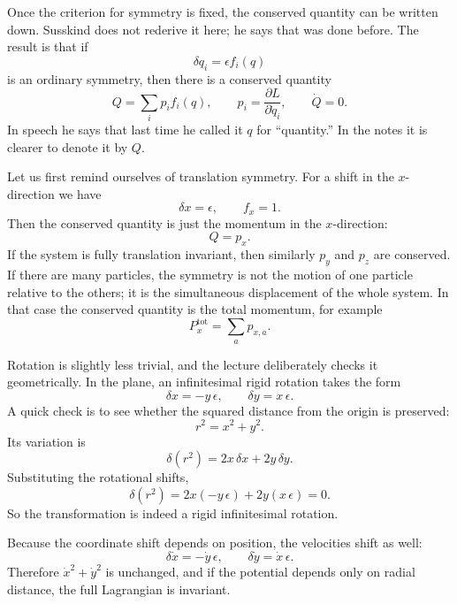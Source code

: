 Once the criterion for symmetry is fixed, the conserved quantity can be written down. Susskind does not rederive it here; he says that was done before. The result is that if
\[
\delta q_i=\epsilon f_i(q)
\]
is an ordinary symmetry, then there is a conserved quantity
\begin{equation}
Q=\sum_i p_i f_i(q),
\qquad
p_i=\frac{\partial L}{\partial \dot q_i},
\qquad
\dot Q=0.
\end{equation}
In speech he says that last time he called it \(q\) for ``quantity.'' In the notes it is clearer to denote it by \(Q\).

Let us first remind ourselves of translation symmetry. For a shift in the \(x\)-direction we have
\begin{equation}
\delta x=\epsilon,
\qquad
f_x=1.
\end{equation}
Then the conserved quantity is just the momentum in the \(x\)-direction:
\[
Q=p_x.
\]
If the system is fully translation invariant, then similarly \(p_y\) and \(p_z\) are conserved. If there are many particles, the symmetry is not the motion of one particle relative to the others; it is the simultaneous displacement of the whole system. In that case the conserved quantity is the total momentum, for example
\begin{equation}
P_x^{\mathrm{tot}}=\sum_a p_{x,a}.
\end{equation}

Rotation is slightly less trivial, and the lecture deliberately checks it geometrically. In the plane, an infinitesimal rigid rotation takes the form
\begin{equation}
\delta x=-y\,\epsilon,
\qquad
\delta y=x\,\epsilon.
\end{equation}
A quick check is to see whether the squared distance from the origin is preserved:
\begin{equation}
r^2=x^2+y^2.
\end{equation}
Its variation is
\begin{equation}
\delta(r^2)=2x\,\delta x+2y\,\delta y.
\end{equation}
Substituting the rotational shifts,
\begin{equation}
\delta(r^2)=2x(-y\,\epsilon)+2y(x\,\epsilon)=0.
\end{equation}
So the transformation is indeed a rigid infinitesimal rotation.

Because the coordinate shift depends on position, the velocities shift as well:
\begin{equation}
\delta \dot x=-\dot y\,\epsilon,
\qquad
\delta \dot y=\dot x\,\epsilon.
\end{equation}
Therefore \(\dot x^2+\dot y^2\) is unchanged, and if the potential depends only on radial distance, the full Lagrangian is invariant.

